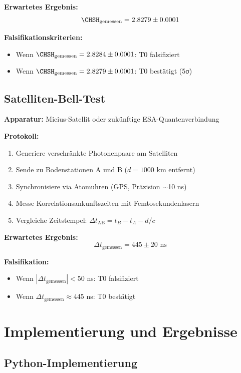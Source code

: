 \textbf{Erwartetes Ergebnis:}
\begin{equation}
	\CHSH_{\text{gemessen}} = 2.8279 \pm 0.0001
\end{equation}

\textbf{Falsifikationskriterien:}
\begin{itemize}
	\item Wenn $\CHSH_{\text{gemessen}} = 2.8284 \pm 0.0001$: T0 falsifiziert
	\item Wenn $\CHSH_{\text{gemessen}} = 2.8279 \pm 0.0001$: T0 bestätigt (5σ)
\end{itemize}

\subsection{Satelliten-Bell-Test}

\textbf{Apparatur:} Micius-Satellit oder zukünftige ESA-Quantenverbindung

\textbf{Protokoll:}
\begin{enumerate}
	\item Generiere verschränkte Photonenpaare am Satelliten
	\item Sende zu Bodenstationen A und B ($d = 1000$ km entfernt)
	\item Synchronisiere via Atomuhren (GPS, Präzision $\sim$10 ns)
	\item Messe Korrelationsankunftszeiten mit Femtosekundenlasern
	\item Vergleiche Zeitstempel: $\Delta t_{\text{AB}} = t_B - t_A - d/c$
\end{enumerate}

\textbf{Erwartetes Ergebnis:}
\begin{equation}
	\Delta t_{\text{gemessen}} = 445 \pm 20 \text{ ns}
\end{equation}

\textbf{Falsifikation:}
\begin{itemize}
	\item Wenn $|\Delta t_{\text{gemessen}}| < 50$ ns: T0 falsifiziert
	\item Wenn $\Delta t_{\text{gemessen}} \approx 445$ ns: T0 bestätigt
\end{itemize}

\section{Implementierung und Ergebnisse}
\label{sec:implementation}

\subsection{Python-Implementierung}

